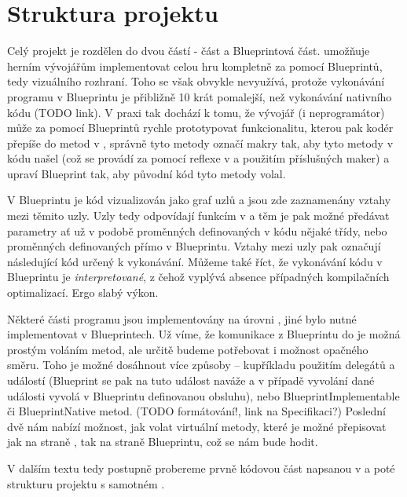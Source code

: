 
\section{Struktura projektu}

Celý projekt je rozdělen do dvou částí - \CPP{} část a Blueprintová část. \UE{} umožňuje herním vývojářům implementovat celou hru kompletně za pomocí Blueprintů, tedy vizuálního rozhraní. Toho se však obvykle nevyužívá, protože vykonávání programu v Blueprintu je přibližně 10 krát pomalejší, než vykonávání nativního \CPP{} kódu (TODO link). V praxi tak dochází k tomu, že vývojář (i neprogramátor) může za pomocí Blueprintů rychle prototypovat funkcionalitu, kterou pak kodér přepíše do metod v \CPP{}, správně tyto metody označí makry tak, aby \UE{} tyto metody v kódu našel (což se provádí za pomocí reflexe v \UBT{} a použitím příslušných \CPP{} maker) a upraví Blueprint tak, aby původní kód tyto metody volal.

 V Blueprintu je kód vizualizován jako graf uzlů a jsou zde zaznamenány vztahy mezi těmito uzly. Uzly tedy odpovídají funkcím v \CPP{} a těm je pak možné předávat parametry ať už v podobě proměnných definovaných v \CPP{} kódu nějaké třídy, nebo proměnných definovaných přímo v Blueprintu. Vztahy mezi uzly pak označují následující kód určený k vykonávání. Můžeme také říct, že vykonávání kódu v Blueprintu je \textit{interpretované}, z čehož vyplývá absence případných kompilačních optimalizací. Ergo slabý výkon. 

Některé části programu jsou implementovány na úrovni \CPP{}, jiné bylo nutné implementovat v Blueprintech. Už víme, že komunikace z Blueprintu do \CPP{} je možná prostým voláním metod, ale určitě budeme potřebovat i možnost opačného směru. Toho je možné dosáhnout více způsoby -- kupříkladu použitím delegátů a událostí (Blueprint se pak na tuto událost naváže a v případě vyvolání dané události vyvolá v Blueprintu definovanou obsluhu), nebo BlueprintImplementable či BlueprintNative metod. (TODO formátování!, link na Specifikaci?) Poslední dvě nám nabízí možnost, jak volat virtuální metody, které je možné přepisovat jak na straně \CPP{}, tak na straně Blueprintu, což se nám bude hodit.

V dalším textu tedy postupně probereme prvně kódovou část napsanou v \CPP{} a poté strukturu projektu s samotném \UE{}.


